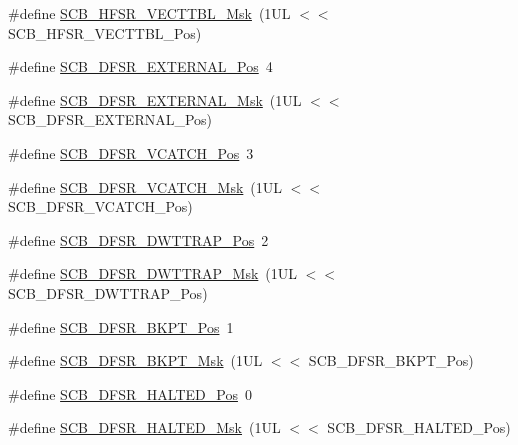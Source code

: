 \begin{DoxyCompactItemize}
\item 
\#define \hyperlink{group___c_m_s_i_s___s_c_b_gaac5e289211d0a63fe879a9691cb9e1a9}{S\+C\+B\+\_\+\+H\+F\+S\+R\+\_\+\+V\+E\+C\+T\+T\+B\+L\+\_\+\+Msk}~(1\+U\+L $<$$<$ S\+C\+B\+\_\+\+H\+F\+S\+R\+\_\+\+V\+E\+C\+T\+T\+B\+L\+\_\+\+Pos)
\item 
\#define \hyperlink{group___c_m_s_i_s___s_c_b_ga13f502fb5ac673df9c287488c40b0c1d}{S\+C\+B\+\_\+\+D\+F\+S\+R\+\_\+\+E\+X\+T\+E\+R\+N\+A\+L\+\_\+\+Pos}~4
\item 
\#define \hyperlink{group___c_m_s_i_s___s_c_b_ga3cba2ec1f588ce0b10b191d6b0d23399}{S\+C\+B\+\_\+\+D\+F\+S\+R\+\_\+\+E\+X\+T\+E\+R\+N\+A\+L\+\_\+\+Msk}~(1\+U\+L $<$$<$ S\+C\+B\+\_\+\+D\+F\+S\+R\+\_\+\+E\+X\+T\+E\+R\+N\+A\+L\+\_\+\+Pos)
\item 
\#define \hyperlink{group___c_m_s_i_s___s_c_b_gad02d3eaf062ac184c18a7889c9b6de57}{S\+C\+B\+\_\+\+D\+F\+S\+R\+\_\+\+V\+C\+A\+T\+C\+H\+\_\+\+Pos}~3
\item 
\#define \hyperlink{group___c_m_s_i_s___s_c_b_gacbb931575c07b324ec793775b7c44d05}{S\+C\+B\+\_\+\+D\+F\+S\+R\+\_\+\+V\+C\+A\+T\+C\+H\+\_\+\+Msk}~(1\+U\+L $<$$<$ S\+C\+B\+\_\+\+D\+F\+S\+R\+\_\+\+V\+C\+A\+T\+C\+H\+\_\+\+Pos)
\item 
\#define \hyperlink{group___c_m_s_i_s___s_c_b_gaccf82364c6d0ed7206f1084277b7cc61}{S\+C\+B\+\_\+\+D\+F\+S\+R\+\_\+\+D\+W\+T\+T\+R\+A\+P\+\_\+\+Pos}~2
\item 
\#define \hyperlink{group___c_m_s_i_s___s_c_b_ga3f7384b8a761704655fd45396a305663}{S\+C\+B\+\_\+\+D\+F\+S\+R\+\_\+\+D\+W\+T\+T\+R\+A\+P\+\_\+\+Msk}~(1\+U\+L $<$$<$ S\+C\+B\+\_\+\+D\+F\+S\+R\+\_\+\+D\+W\+T\+T\+R\+A\+P\+\_\+\+Pos)
\item 
\#define \hyperlink{group___c_m_s_i_s___s_c_b_gaf28fdce48655f0dcefb383aebf26b050}{S\+C\+B\+\_\+\+D\+F\+S\+R\+\_\+\+B\+K\+P\+T\+\_\+\+Pos}~1
\item 
\#define \hyperlink{group___c_m_s_i_s___s_c_b_ga609edf8f50bc49adb51ae28bcecefe1f}{S\+C\+B\+\_\+\+D\+F\+S\+R\+\_\+\+B\+K\+P\+T\+\_\+\+Msk}~(1\+U\+L $<$$<$ S\+C\+B\+\_\+\+D\+F\+S\+R\+\_\+\+B\+K\+P\+T\+\_\+\+Pos)
\item 
\#define \hyperlink{group___c_m_s_i_s___s_c_b_gaef4ec28427f9f88ac70a13ae4e541378}{S\+C\+B\+\_\+\+D\+F\+S\+R\+\_\+\+H\+A\+L\+T\+E\+D\+\_\+\+Pos}~0
\item 
\#define \hyperlink{group___c_m_s_i_s___s_c_b_ga200bcf918d57443b5e29e8ce552e4bdf}{S\+C\+B\+\_\+\+D\+F\+S\+R\+\_\+\+H\+A\+L\+T\+E\+D\+\_\+\+Msk}~(1\+U\+L $<$$<$ S\+C\+B\+\_\+\+D\+F\+S\+R\+\_\+\+H\+A\+L\+T\+E\+D\+\_\+\+Pos)
\item 

\end{DoxyCompactItemize}

